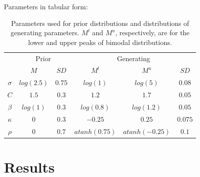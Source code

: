 \documentclass{article}\usepackage{knitr}
\begin{document}
Parameters in tabular form:

\begin{table}[]
\centering
\caption{Parameters used for prior distributions and distributions of generating parameters. $M^l$ and $M^u$, respectively, are for the lower and upper peaks of bimodal distributions.}
\begin{tabular}{cccccc}
\toprule

          & \multicolumn{2}{c}{Prior} & \multicolumn{3}{c}{Generating}   \\
          \cmidrule(lr){2-3}\cmidrule(lr){4-6}
          & $M$       & $SD$    & $M^l$         & $M^u$         & $SD$   \\
\midrule
$\sigma$  & $log(2.5)$  & $0.75$   & $log(1)$    & $log(5)$    & $0.08$ \\
$C$       & $1.5$            & $0.3$   & $1.2$         & $1.7$         & $0.05$  \\
$\beta$   & $log(1)$  & $0.3$   & $log(0.8)$    & $log(1.2)$    & $0.05$ \\
$\kappa$  & $0$            & $0.3$   & $-0.25$        & $0.25$         & $0.075$ \\
$\rho$    & $0$            & $0.7$  & $atanh(0.75)$ & $atanh(-0.25)$  & $0.1$ \\
\bottomrule
\end{tabular}
\end{table}

\section{Results}


\clearpage


\end{document}
